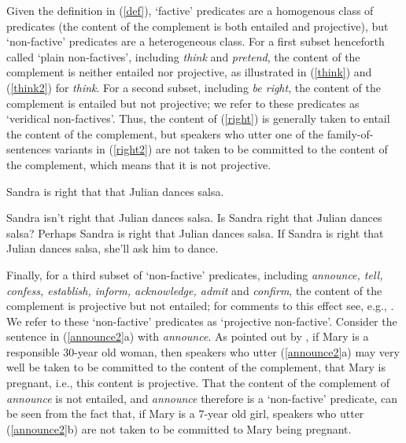 \documentclass[11pt,fleqn]{article}
\newcommand{\6}{\mbox{$[\hspace*{-.6mm}[$}}
\newcommand{\9}{\mbox{$]\hspace*{-.6mm}]$}}
\begin{document}
Given the definition in (\ref{def}), `factive' predicates are a homogenous class of predicates (the content of the complement is both entailed and projective), but `non-factive' predicates are a heterogeneous class. For a first subset henceforth called `plain non-factives', including {\em think} and {\em pretend}, the content of the complement is neither entailed nor projective, as illustrated in (\ref{think}) and (\ref{think2}) for {\em think}. For a second subset, including {\em be right}, the content of the complement is entailed but not projective; we refer to these predicates as `veridical non-factives'. Thus, the content of (\ref{right}) is generally taken to entail the content of the complement, but speakers who utter one of the family-of-sentences variants in (\ref{right2}) are not taken to be committed to the content of the complement, which means that it is not projective. 

\begin{exe}
\ex\label{right} Sandra is right that that Julian dances salsa.
\ex\label{right2} 

\begin{xlist} 
\ex Sandra isn't right that Julian dances salsa. 
\ex Is Sandra right that Julian dances salsa?
\ex Perhaps Sandra is right that Julian dances salsa.
\ex If Sandra is right that Julian dances salsa, she'll ask him to dance. 
\end{xlist}
\end{exe}
Finally, for a third subset of `non-factive' predicates, including {\em announce, tell, confess, establish, inform, acknowledge, admit} and {\em confirm}, the content of the complement is projective but not entailed; for comments to this effect see, e.g., \citealt{reis1973,melvold1991,schultz2003,swanson2012,anand-hacquard2014,spector-egre2015,karttunen2016,tbd-variability}.  We refer to these `non-factive' predicates as `projective non-factive'. Consider the sentence in (\ref{announce2}a) with {\em announce}. As pointed out by \citet[139]{schlenker10}, if Mary is a responsible 30-year old woman, then speakers who utter (\ref{announce2}a) may very well be taken to be committed to the content of the complement, that Mary is pregnant, i.e., this content is projective. That the content of the complement of {\em announce} is not entailed, and {\em announce} therefore is a `non-factive' predicate, can be seen from the fact that, if Mary is a 7-year old girl, speakers who utter (\ref{announce2}b)  are not taken to be committed to Mary being pregnant. 
\end{document}
